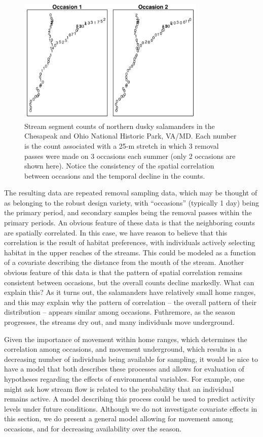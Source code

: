 \begin{figure}
  \centering
  \includegraphics[width=0.8\textwidth]{Ch18-Unmarked/figs/saln27}
  \caption{Stream segment counts of northern dusky salamanders
    in the Chesapeak and Ohio National Historic Park,
    VA/MD. Each number is the count associated with a 25-m stretch in which 3 removal passes
    were made on 3 occasions each summer (only 2 occasions are shown
    here). Notice the consistency of the spatial correlation between
    occasions and the temporal decline in the counts.}
  \label{unmarked.fig.salct}
\end{figure}


The resulting data are repeated removal sampling data, which may be
thought of as belonging to the robust design variety, with
``occasions'' (typically 1 day) being the primary period, and
secondary samples being the removal passes within the primary
periods. An obvious feature of these data is that the neighboring
counts are spatially correlated. In this case, we have reason to
believe that this correlation is the result of habitat preferences,
with individuals actively selecting habitat in the upper reaches of
the streams. This could be modeled as a function of a covariate
describing the distance from the mouth of the stream. Another obvious
feature of this data is that the pattern of spatial correlation
remains consistent between occasions, but the overall counts decline
markedly. What can explain this? As it turns out, the salamanders have
relatively small home ranges, and this may explain why the pattern of
correlation -- the overall pattern of their distribution -- appears
similar among occasions. Futhremore, as the season progresses, the
streams dry out, and many individuals move underground.

Given the importance of movement within home ranges, which determines
the correlation among occasions, and movement underground, which
results in a decreasing number of individuals being available for
sampling, it would be nice to have a model that both describes these
processes and allows for evaluation of hypotheses regarding the
effects of environmental variables. For example, one might ask how
stream flow is related to the probability that an individual remains
active. A model describing this process could be used to predict
activity levels under future conditions. Although we do not
investigate covariate effects in this section, we do present a general
model allowing for movement among occasions, and for decreasing
availability over the season.


